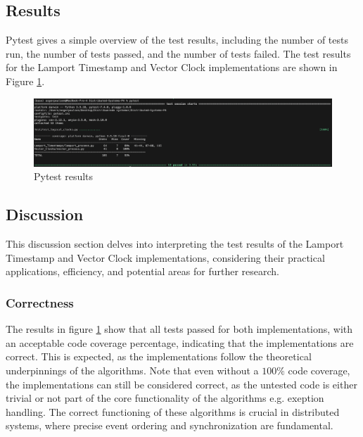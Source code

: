 \documentclass{article}
\begin{document}
   
  \subsection{Results}
      Pytest gives a simple overview of the test results, including the number of tests run, the number of tests passed, and the number of tests failed. The test results for the Lamport Timestamp and Vector Clock implementations are shown in Figure \ref{fig:pytest_results}.
      
      \begin{figure}[h!]
        \centering
        \includegraphics[width=\textwidth]{img/test_results.png}
        \caption{Pytest results}
        \label{fig:pytest_results}
      \end{figure}

  \subsection{Discussion}
  This discussion section delves into interpreting the test results of the Lamport Timestamp and Vector Clock implementations, considering their practical applications, efficiency, and potential areas for further research.

  \subsubsection{Correctness}
  The results in figure \ref*{fig:pytest_results} show that all tests passed for both implementations, with an acceptable code coverage percentage, indicating that the implementations are correct. This is expected, as the implementations follow the theoretical underpinnings of the algorithms. Note that even without a $100\%$ code coverage, the implementations can still be considered correct, as the untested code is either trivial or not part of the core functionality of the algorithms e.g. exeption handling. The correct functioning of these algorithms is crucial in distributed systems, where precise event ordering and synchronization are fundamental.
    
\end{document}
